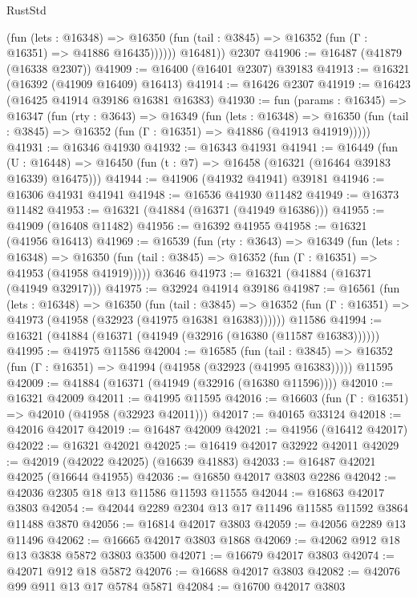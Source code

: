 \begin{lexlean}{RustStd}
\begin{coremodule}
              (fun (lets : @16348) =>
              @16350 (fun (tail : @3845) => @16352 (fun (Γ : @16351) => @41886 @16435))))))
        @16481))
    @2307
@41906 := @16487 (@41879 (@16338 @2307))
@41909 := @16400 (@16401 @2307) @39183
@41913 := @16321 (@16392 (@41909 @16409) @16413)
@41914 := @16426 @2307
@41919 := @16423 (@16425 @41914 @39186 @16381 @16383)
@41930 := fun (params : @16345) =>
  @16347
    (fun (rty : @3643) =>
    @16349
      (fun (lets : @16348) =>
      @16350 (fun (tail : @3845) => @16352 (fun (Γ : @16351) => @41886 (@41913 @41919)))))
@41931 := @16346 @41930
@41932 := @16343 @41931
@41941 := @16449
    (fun (U : @16448) => @16450 (fun (t : @7) => @16458 (@16321 (@16464 @39183 @16339) @16475)))
@41944 := @41906 (@41932 @41941) @39181
@41946 := @16306 @41931 @41941
@41948 := @16536 @41930 @11482
@41949 := @16373 @11482
@41953 := @16321 (@41884 (@16371 (@41949 @16386)))
@41955 := @41909 (@16408 @11482)
@41956 := @16392 @41955
@41958 := @16321 (@41956 @16413)
@41969 := @16539
    (fun (rty : @3643) =>
    @16349
      (fun (lets : @16348) =>
      @16350 (fun (tail : @3845) => @16352 (fun (Γ : @16351) => @41953 (@41958 @41919)))))
    @3646
@41973 := @16321 (@41884 (@16371 (@41949 @32917)))
@41975 := @32924 @41914 @39186
@41987 := @16561
    (fun (lets : @16348) =>
    @16350
      (fun (tail : @3845) =>
      @16352 (fun (Γ : @16351) => @41973 (@41958 (@32923 (@41975 @16381 @16383))))))
    @11586
@41994 := @16321 (@41884 (@16371 (@41949 (@32916 (@16380 (@11587 @16383))))))
@41995 := @41975 @11586
@42004 := @16585
    (fun (tail : @3845) => @16352 (fun (Γ : @16351) => @41994 (@41958 (@32923 (@41995 @16383)))))
    @11595
@42009 := @41884 (@16371 (@41949 (@32916 (@16380 @11596))))
@42010 := @16321 @42009
@42011 := @41995 @11595
@42016 := @16603 (fun (Γ : @16351) => @42010 (@41958 (@32923 @42011)))
@42017 := @40165 @33124
@42018 := @42016 @42017
@42019 := @16487 @42009
@42021 := @41956 (@16412 @42017)
@42022 := @16321 @42021
@42025 := @16419 @42017 @32922 @42011
@42029 := @42019 (@42022 @42025) (@16639 @41883)
@42033 := @16487 @42021 @42025 (@16644 @41955)
@42036 := @16850 @42017 @3803 @2286
@42042 := @42036 @2305 @18 @13 @11586 @11593 @11555
@42044 := @16863 @42017 @3803
@42054 := @42044 @2289 @2304 @13 @17 @11496 @11585 @11592 @3864 @11488 @3870
@42056 := @16814 @42017 @3803
@42059 := @42056 @2289 @13 @11496
@42062 := @16665 @42017 @3803 @1868
@42069 := @42062 @912 @18 @13 @3838 @5872 @3803 @3500
@42071 := @16679 @42017 @3803
@42074 := @42071 @912 @18 @5872
@42076 := @16688 @42017 @3803
@42082 := @42076 @99 @911 @13 @17 @5784 @5871
@42084 := @16700 @42017 @3803

\end{coremodule}
\end{lexlean}
